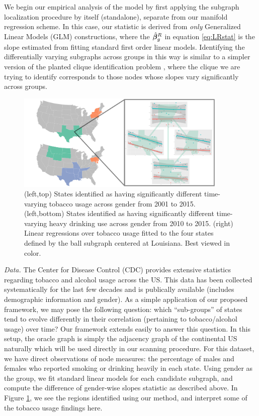 We begin our empirical analysis of the model by first applying the subgraph localization procedure by itself (standalone), separate from our manifold regression scheme. In this case, our statistic is derived from {\em only} Generalized Linear Models (GLM) constructions, where the $\hat{\bm{\beta}}_g^R$ in equation \eqref{eq:LRstat} is the slope estimated from fitting standard first order linear models. Identifying the differentially varying subgraphs across groups in this way is similar to a simpler version of the planted clique identification problem \citep{arora2009computational}, where the clique we are trying to identify corresponds to those nodes whose slopes vary significantly across groups.
\begin{figure}
	\begin{center}
		\includegraphics[trim={0cm 0cm 0cm 0cm}, clip, width=0.9\textwidth]{3_covtraj/figs/tobacco_zoom.pdf}
	\end{center}
	\caption[Tobacco use state relationships via covariance trajectory analysis]{(left,top) States identified as having significantly different time-varying tobacco usage across gender from 2001 to 2015. (left,bottom) States identified as having significantly different time-varying heavy drinking use across gender from 2010 to 2015. (right) Linear regressions over tobacco usage fitted to the four states defined by the ball subgraph centered at Louisiana. Best viewed in color.}
	\label{fig:tobalc}
\end{figure}

{\em Data.} The Center for Disease Control (CDC) provides extensive statistics regarding tobacco and alcohol usage across the US. This data has been collected systematically for the last few decades and is publically available (includes demographic information and gender). As a simple application of our 
proposed framework, 
we may pose the following question: which ``sub-groups'' of states tend to evolve differently in their correlation (pertaining to tobacco/alcohol usage) over time? 
Our framework extends easily to answer this question. In this setup, the oracle graph is simply the adjacency graph of the continental
US naturally which will be used directly in our scanning procedure.
For this dataset, we have direct observations of node measures: the percentage of males and females who 
reported smoking or drinking heavily in each state. Using 
gender as the group, 
we fit standard linear models for each candidate subgraph, and compute the difference of gender-wise 
slopes statistic as described above. 
In Figure \ref{fig:tobalc}, we see the regions identified using our method, and interpret some of the tobacco usage findings here.

